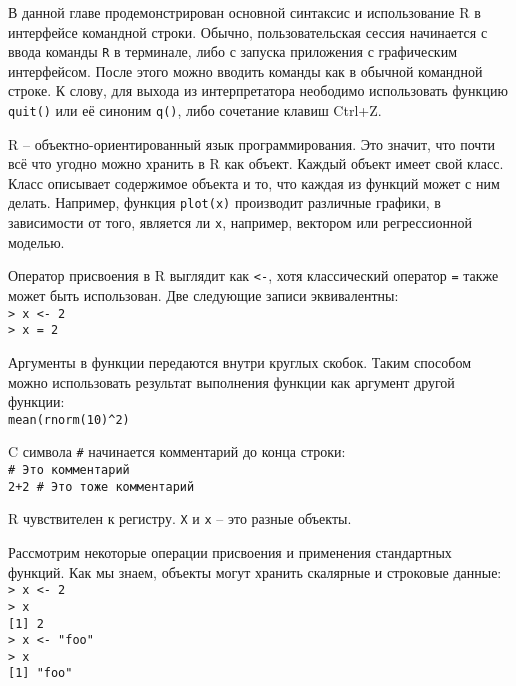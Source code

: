     В данной главе продемонстрирован основной синтаксис и использование R в интерфейсе 
    командной строки. Обычно, пользовательская сессия начинается с ввода команды \texttt{R} в 
    терминале, либо с запуска приложения с графическим интерфейсом. После этого можно вводить
    команды как в обычной командной строке. К слову, для выхода из интерпретатора неободимо
    использовать функцию \texttt{quit()} или её синоним \texttt{q()}, либо сочетание
    клавиш Ctrl+Z.

    R -- объектно-ориентированный язык программирования. Это значит, что почти всё что 
    угодно можно хранить в R как объект. Каждый объект имеет свой класс. Класс описывает
    содержимое объекта и то, что каждая из функций может с ним делать. Например, функция
    \texttt{plot(x)} производит различные графики, в зависимости от того, является ли 
    \texttt{x}, например, вектором или регрессионной моделью. 
    
    Оператор присвоения в R выглядит как \texttt{<-}, хотя классический оператор 
    \texttt{=} также может быть использован. Две следующие записи эквивалентны: \\
    \indent \texttt{> x <- 2} \\
    \indent \texttt{> x = 2} 
    
    Аргументы в функции передаются внутри круглых скобок. Таким способом можно 
    использовать результат выполнения функции как аргумент другой функции: \\
    \indent \texttt{mean(rnorm(10)\^{}2)} 
    
    C символа \texttt{\#} начинается комментарий до конца строки: \\
    \indent \texttt{\# Это комментарий} \\
    \indent \texttt{2+2 \# Это тоже комментарий} 
    
    R чувствителен к регистру. \texttt{X} и \texttt{x} -- это разные объекты. 
    
    Рассмотрим некоторые операции присвоения и применения стандартных функций. Как мы
    знаем, объекты могут хранить скалярные и строковые данные: \\
    \indent \texttt{> x <- 2} \\
    \indent \texttt{> x} \\
    \indent \texttt{[1] 2} \\
    \indent \texttt{> x <- "foo"} \\
    \indent \texttt{> x } \\
    \indent \texttt{[1] "foo"} 
    
